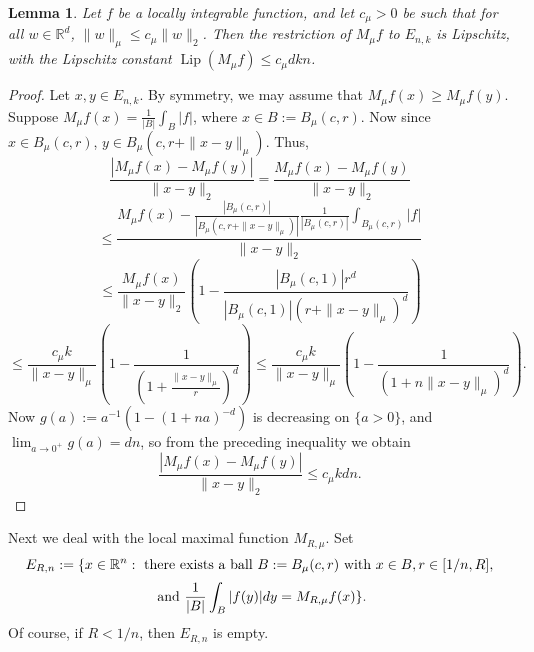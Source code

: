 \documentclass[12pt]{amsart}
\numberwithin{equation}{section}
\theoremstyle{plain}
\newtheorem{lemma}[theorem]{Lemma}
\theoremstyle{definition}
\theoremstyle{remark}
\begin{document}
\begin{lemma}\label{bolasgrandes} Let $f$ be a locally integrable
function, and let $c_\mu > 0$ be such that
for all $w\in \mathbb{R}^d$,
$\|w\|_\mu \le c_\mu \|w\|_2$.
  Then the restriction of $M_\mu f$  to $E_{n,k}$
  is Lipschitz, with the Lipschitz constant $\operatorname{Lip}(M_{\mu} f) \le c_\mu dkn$.
  \end{lemma}

\begin{proof}
  Let $x,y\in E_{n,k}$. By symmetry, we may assume
  that $M_{\mu} f(x)\ge M_{\mu} f(y)$.
     Suppose  $M_{\mu} f(x) =   \frac{1}{|B|}\int_B |f|$, where $x\in B:= B_\mu (c,r)$.
Now since $x\in B_\mu(c,r)$, $y\in B_\mu(c,r+\|x-y\|_\mu)$. Thus,
  \begin{equation*}
    \frac{|M_{\mu}f(x)-M_\mu f(y)|}{\|x-y\|_2}= \frac{M_{\mu}f(x)-M_\mu f(y)}{\|x-y\|_2}
  \end{equation*}
  \begin{equation*}
   \le  \frac{M_{\mu}f(x)-\frac{| B_\mu (c,r)|}{|B_\mu(c,r+\|x-y\|_\mu)|} \frac{1}{| B_\mu (c,r)|}\int_{B_\mu (c,r)} |f|}{\|x-y\|_2}
   \end{equation*}
  \begin{equation*}
  \le \frac{M_{\mu}f(x)}{\|x-y\|_2}\left(1-\frac{|B_\mu(c,1)|r^d}{|B_\mu(c,1)|(r+\|x-y\|_\mu)^d}\right)
  \end{equation*}
  \begin{equation*}
   \le   \frac{c_\mu k}{\|x-y\|_\mu}\left(1-\frac{1}{\left(1+\frac{\|x-y\|_\mu}{r}\right)^d}\right)
   \le
   \frac{c_\mu k}{\|x-y\|_\mu}\left(1-\frac{1}{ (1+n\|x-y\|_\mu)^d}\right).
  \end{equation*}
Now $g(a) := a^{-1}\left(1- (1+na)^{-d}\right)$ is decreasing on $\{a>0\}$, and $\lim_{a\to 0^+}g(a)=d n$, so   from the preceding inequality we obtain
  \begin{equation*}
    \frac{|M_{\mu}f(x)-M_\mu f(y)|}{\|x-y\|_2}\le  c_\mu k d n.
  \end{equation*}
  \end{proof}

Next we deal with the local maximal function $M_{R,\mu}$.
Set
\begin{equation}\label{ern}
  E_{R, n}:=\{x\in\mathbb{R}^n:  \textnormal{ there exists a ball } B:= B_\mu(c,r) \textnormal{ with  } x\in B , r\in [1/n, R],
  \end{equation}
\begin{equation*}
 \textnormal{ and }
  \frac{1}{|B|}\int_{B} |f(y)|dy =  M_{R,\mu}f(x)\}.
\end{equation*}
Of course, if $R <  1/n$, then $E_{R, n}$ is empty.
\end{document}
